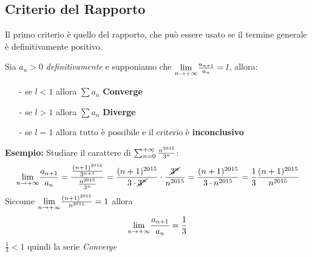 \documentclass[12pt, a4paper, openany]{book}
\newcommand{\esempio}[1]{\begin{box_esempio} \textbf{Esempio: }#1\end{box_esempio}}
\newcommand{\definizione}[1]{\begin{box_definizione} #1 \end{box_definizione}}
\begin{document}
\subsection{Criterio del Rapporto}
Il primo criterio è quello del rapporto, che può essere usato se il termine generale è definitivamente positivo.
\definizione{
    Sia $a_n > 0$ \emph{definitivamente} e supponiamo che $\underset{n \to +\infty}{\lim} \frac{a_{n+1}}{a_n} = l$, allora:
    \begin{itemize}
        \item[-] se $l<1$ allora $\sum a_n$ \textbf{Converge}
        \item[-] se $l>1$ allora $\sum a_n$ \textbf{Diverge}
        \item[-] se $l=1$ allora tutto è possibile e il criterio è \textbf{inconclusivo}  
    \end{itemize}
}
\nb{che siccome $a_n > 0$ allora $l\in [0,+\infty)$ oppure $l = +\infty$}

\esempio{
    Studiare il carattere di $\sum_{n=0}^{+\infty} \frac{n^{2015}}{3^n}$:
    \begin{equation*}
        \underset{n \to +\infty}{\lim} \frac{a_{n+1}}{a_n} = \frac{\frac{(n+1)^{2015}}{3^{n+1}}}{\frac{n^{2015}}{3^n}} = 
        \frac{(n+1)^{2015}}{3 \cdot \cancel{3^n}} \cdot \frac{\cancel{3^n}}{n^{2015}} =
        \frac{(n+1)^{2015}}{3 \cdot n^{2015}} = \frac{1}{3} \frac{(n+1)^{2015}}{n^{2015}}
    \end{equation*}
    Siccome $\underset{n \to +\infty}{\lim} \frac{(n+1)^{2015}}{n^{2015}} = 1$ allora
    \begin{equation*}
        \underset{n \to +\infty}{\lim} \frac{a_{n+1}}{a_n} = \frac{1}{3}
    \end{equation*}
    $\frac{1}{3} < 1$ quindi la serie \emph{Converge}
}
\end{document}
